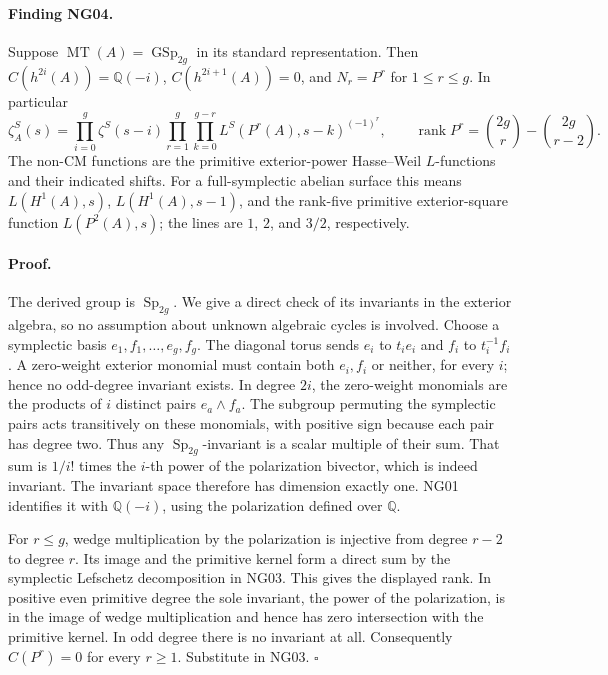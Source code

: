 \documentclass[11pt]{article}
\theoremstyle{remark}
\begin{document}
\paragraph{Finding NG04.}
Suppose $\operatorname{MT}(A)=\operatorname{GSp}_{2g}$ in its standard
representation.  Then $C(h^{2i}(A))=\mathbb Q(-i)$,
$C(h^{2i+1}(A))=0$, and $N_r=P^r$ for $1\le r\le g$.
In particular
\[
 \zeta_A^S(s)=\prod_{i=0}^g\zeta^S(s-i)
       \prod_{r=1}^g\prod_{k=0}^{g-r}L^S(P^r(A),s-k)^{(-1)^r},
 \qquad \operatorname{rank}P^r={2g\choose r}-{2g\choose r-2}. \tag{NG04.1}
\]
The non-CM functions are the primitive exterior-power Hasse--Weil
$L$-functions and their indicated shifts.  For a full-symplectic
abelian surface this means $L(H^1(A),s)$,
$L(H^1(A),s-1)$, and the rank-five primitive exterior-square function
$L(P^2(A),s)$; the lines are $1$, $2$, and $3/2$, respectively.

\paragraph{Proof.}
The derived group is $\operatorname{Sp}_{2g}$.  We give a direct check
of its invariants in the exterior algebra, so no assumption about
unknown algebraic cycles is involved.  Choose a symplectic basis
$e_1,f_1,\ldots,e_g,f_g$.  The diagonal torus sends $e_i$ to $t_i e_i$
and $f_i$ to $t_i^{-1}f_i$.  A zero-weight exterior monomial must
contain both $e_i,f_i$ or neither, for every $i$; hence no odd-degree
invariant exists.  In degree $2i$, the zero-weight monomials are the
products of $i$ distinct pairs $e_a\wedge f_a$.  The subgroup
permuting the symplectic pairs acts transitively on these monomials,
with positive sign because each pair has degree two.  Thus any
$\operatorname{Sp}_{2g}$-invariant is a scalar multiple of their sum.
That sum is $1/i!$ times the $i$-th power of the polarization bivector,
which is indeed invariant.  The invariant space therefore has
dimension exactly one.  NG01 identifies it with $\mathbb Q(-i)$,
using the polarization defined over $\mathbb Q$.

For $r\le g$, wedge multiplication by the polarization is injective
from degree $r-2$ to degree $r$.  Its image and the primitive kernel
form a direct sum by the symplectic Lefschetz decomposition in NG03.
This gives the displayed rank.  In positive even primitive degree
the sole invariant, the power of the polarization, is in the image
of wedge multiplication and hence has zero intersection with the
primitive kernel.  In odd degree there is no invariant at all.
Consequently $C(P^r)=0$ for every $r\ge1$.  Substitute in NG03.
\hfill$\square$
\end{document}
